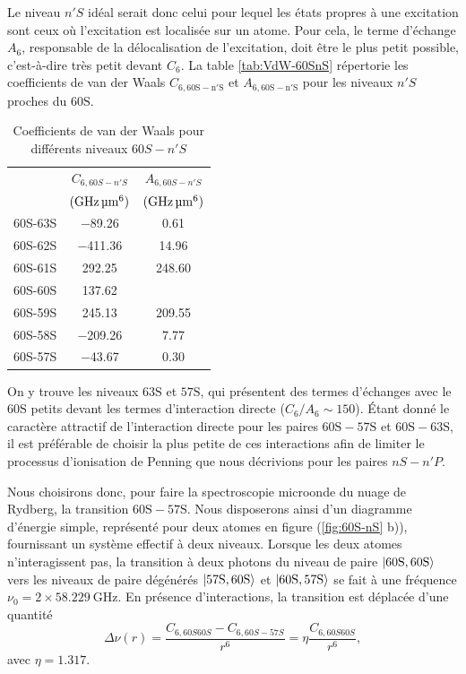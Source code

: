 Le niveau $n'S$ idéal serait donc celui pour lequel les états propres à une excitation sont ceux où l'excitation est localisée sur un atome.
Pour cela, le terme d'échange $A_6$, responsable de la délocalisation de l'excitation, doit être le plus petit possible, c'est-à-dire très petit devant $C_6$.
La table \eqref{tab:VdW-60SnS} répertorie les coefficients de van der Waals $C_{6,\mathrm{60S-n'S}}$ et $A_{6,\mathrm{60S-n'S}}$ pour les niveaux $n'S$ proches du $\mathrm{60S}$.
%
\begin{table}[!h]
	\centering
	\caption[Coefficients de van der Waals pour différents niveaux $60S-n'S$]{Coefficients de van der Waals pour différents niveaux $60S-n'S$
	}
	\label{tab:VdW-60SnS}
	\begin{tabular}{c c c}
		\toprule\midrule
		~
		& $C_{6,60S-n'S}$
		& $A_{6,60S-n'S}$\\		
		~
		& $(\si{\GHz\raiseto{6}\um})$
		& $(\si{\GHz\raiseto{6}\um})$\\
		\midrule
		60S-63S & \SI{-89.26}{} & \SI{0.61}{} \\
		60S-62S & \SI{-411.36}{} & \SI{14.96}{} \\
		60S-61S & \SI{292.25}{} & \SI{248.60}{} \\
		60S-60S & \SI{137.62}{} & \SI{}{} \\
		60S-59S & \SI{245.13}{} & \SI{209.55}{} \\
		60S-58S & \SI{-209.26}{} & \SI{7.77}{} \\
		60S-57S & \SI{-43.67}{} & \SI{0.30}{} \\
		\midrule
		\bottomrule
 	\end{tabular}
\end{table}
%
On y trouve les niveaux $\mathrm{63S}$ et $\mathrm{57S}$, qui présentent des termes d'échanges avec le $\mathrm{60S}$ petits devant les termes d'interaction directe ($C_6 / A_6 \sim 150$).
Étant donné le caractère attractif de l'interaction directe pour les paires $\mathrm{60S-57S}$ et $\mathrm{60S-63S}$, il est préférable de choisir la plus petite de ces interactions afin de limiter le processus d'ionisation de Penning que nous décrivions pour les paires $nS-n'P$.

Nous choisirons donc, pour faire la spectroscopie microonde du nuage de Rydberg, la transition $\mathrm{60S-57S}$.
Nous disposerons ainsi d'un diagramme d'énergie simple, représenté pour deux atomes en figure (\ref{fig:60S-nS} b)), fournissant un système effectif à deux niveaux.
Lorsque les deux atomes n'interagissent pas, la transition à deux photons du niveau de paire $\ket{\mathrm{60S,60S}}$ vers les niveaux de paire dégénérés $\ket{\mathrm{57S,60S}}$ et $\ket{\mathrm{60S,57S}}$ se fait à une fréquence $\nu_0 = 2\times \SI{58.229}{\GHz}$.
En présence d'interactions, la transition est déplacée d'une quantité
\begin{equation}
\label{eq:60s-57s_2atoms}
\Delta\nu (r) = \frac{C_{6,60S60S}-C_{6,60S-57S}}{r^6} = \eta \frac{C_{6,60S60S}}{r^6},
\end{equation}
avec $\eta = \num{1.317}$.

